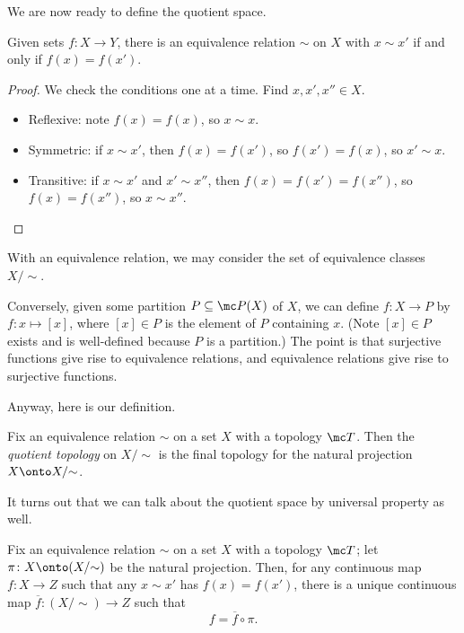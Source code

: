\documentclass[../notes.tex]{subfiles}
\begin{document}
We are now ready to define the quotient space.
\begin{lemma}
	Given sets $f\colon X\to Y$, there is an equivalence relation $\sim$ on $X$ with $x\sim x'$ if and only if $f(x)=f(x')$.
\end{lemma}
\begin{proof}
	We check the conditions one at a time. Find $x,x',x''\in X$.
	\begin{itemize}
		\item Reflexive: note $f(x)=f(x)$, so $x\sim x$.
		\item Symmetric: if $x\sim x'$, then $f(x)=f(x')$, so $f(x')=f(x)$, so $x'\sim x$.
		\item Transitive: if $x\sim x'$ and $x'\sim x''$, then $f(x)=f(x')=f(x'')$, so $f(x)=f(x'')$, so $x\sim x''$.
		\qedhere
	\end{itemize}
\end{proof}
With an equivalence relation, we may consider the set of equivalence classes $X/{\sim}$.
\begin{remark}
	Conversely, given some partition $P\subseteq\mc P(X)$ of $X$, we can define $f\colon X\to P$ by $f\colon x\mapsto[x]$, where $[x]\in P$ is the element of $P$ containing $x$. (Note $[x]\in P$ exists and is well-defined because $P$ is a partition.) The point is that surjective functions give rise to equivalence relations, and equivalence relations give rise to surjective functions.
\end{remark}
Anyway, here is our definition.
\begin{defihelper} 
	Fix an equivalence relation $\sim$ on a set $X$ with a topology $\mc T$. Then the \textit{quotient topology} on $X/{\sim}$ is the final topology for the natural projection $X\onto X/{\sim}$.
\end{defihelper}
It turns out that we can talk about the quotient space by universal property as well.
\begin{proposition} \label{prop:quotientup}
	Fix an equivalence relation $\sim$ on a set $X$ with a topology $\mc T$; let $\pi\colon X\onto(X/{\sim})$ be the natural projection. Then, for any continuous map $f\colon X\to Z$ such that any $x\sim x'$ has $f(x)=f(x')$, there is a unique continuous map $\overline f\colon(X/{\sim})\to Z$ such that
	\[f=\overline f\circ\pi.\]
\end{proposition}
\end{document}
